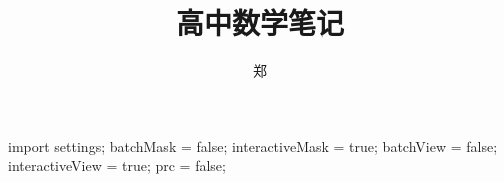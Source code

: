 \documentclass[a4paper, UTF8]{ctexbook}
\title{{\Huge 高中数学笔记}}
\author{郑}
\begin{document}
\begin{asydef}
	import settings;
	batchMask = false;
	interactiveMask = true;
	batchView = false;
	interactiveView = true;
	prc = false;
\end{asydef}

\frontmatter
\maketitle

\end{document}
